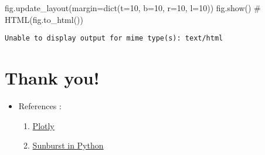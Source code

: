 \documentclass[
  letterpaper,
  DIV=11,
  numbers=noendperiod]{scrartcl}
\newenvironment{Shaded}{\begin{snugshade}}{\end{snugshade}}
\newcommand{\BuiltInTok}[1]{\textcolor[rgb]{0.00,0.23,0.31}{#1}}
\newcommand{\CommentTok}[1]{\textcolor[rgb]{0.37,0.37,0.37}{#1}}
\newcommand{\DecValTok}[1]{\textcolor[rgb]{0.68,0.00,0.00}{#1}}
\newcommand{\NormalTok}[1]{\textcolor[rgb]{0.00,0.23,0.31}{#1}}
\newcommand{\OperatorTok}[1]{\textcolor[rgb]{0.37,0.37,0.37}{#1}}
\providecommand{\tightlist}{%
  \setlength{\itemsep}{0pt}\setlength{\parskip}{0pt}}\usepackage{longtable,booktabs,array}
\begin{document}
\begin{Shaded}
\begin{Highlighting}[]
\NormalTok{fig.update\_layout(margin}\OperatorTok{=}\BuiltInTok{dict}\NormalTok{(t}\OperatorTok{=}\DecValTok{10}\NormalTok{, b}\OperatorTok{=}\DecValTok{10}\NormalTok{, r}\OperatorTok{=}\DecValTok{10}\NormalTok{, l}\OperatorTok{=}\DecValTok{10}\NormalTok{))}
\NormalTok{fig.show()}
\CommentTok{\# HTML(fig.to\_html()) }
\end{Highlighting}
\end{Shaded}

\begin{verbatim}
Unable to display output for mime type(s): text/html
\end{verbatim}

\hypertarget{thank-you}{%
\section{Thank you!}\label{thank-you}}

\begin{itemize}
\item
  References :

  \begin{enumerate}
  \def\labelenumi{\arabic{enumi}.}
  \tightlist
  \item
    \href{https://plotly.com/}{Plotly}
  \item
    \href{https://plotly.com/python/sunburst-charts/}{Sunburst in
    Python}
  \end{enumerate}
\end{itemize}
\end{document}
